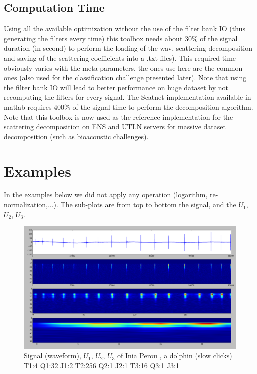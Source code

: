 \documentclass[a4paper]{report}
\begin{document}
\subsection{Computation Time}

Using all the available optimization without the use of the filter bank IO (thus generating the filters every time) this toolbox needs about $30\%$ of the signal duration (in second) to perform the loading of the wav, scattering decomposition and saving of the scattering coefficients into a .txt files). This required time obviously varies with the meta-parameters, the ones use here are the common ones (also used for the classification challenge presented later).
Note that using the filter bank IO will lead to better performance on huge dataset by not recomputing the filters for every signal.
The Scatnet implementation available in matlab requires $400\%$ of the signal time to perform the decomposition algorithm.
\\
Note that this toolbox is now used as the reference implementation for the scattering decomposition on ENS and UTLN servers for massive dataset decomposition (such as bioacoustic challenges). 
\section{Examples}
In the examples below we did not apply any operation (logarithm, re-normalization,...). The sub-plots are from top to bottom the
signal, and the $U_1$, $U_2$, $U_3$.
\begin{figure}[H]
\begin{center}
\includegraphics[scale=0.21]{slow.png}\caption{Signal (waveform), $U_1$, $U_2$, $U_3$ of Inia Perou \cite{trone2015}, a dolphin (slow clicks) T1:4 Q1:32 J1:2 T2:256 Q2:1 J2:1 T3:16 Q3:1 J3:1}
\end{center}
\end{figure}
\end{document}
